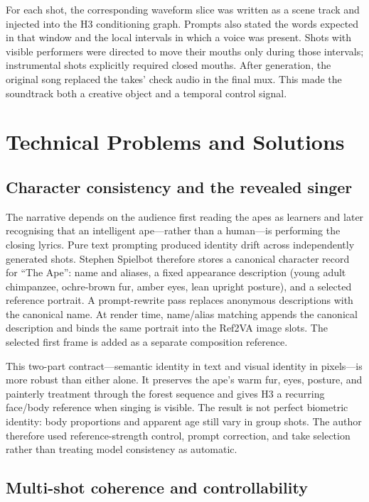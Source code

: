 \documentclass[sigconf]{acmart}
\begin{document}
For each shot, the corresponding waveform slice was written as a scene track and injected into the H3 conditioning graph. Prompts also stated the words expected in that window and the local intervals in which a voice was present. Shots with visible performers were directed to move their mouths only during those intervals; instrumental shots explicitly required closed mouths. After generation, the original song replaced the takes' check audio in the final mux. This made the soundtrack both a creative object and a temporal control signal.

\section{Technical Problems and Solutions}

\subsection{Character consistency and the revealed singer}

The narrative depends on the audience first reading the apes as learners and later recognising that an intelligent ape---rather than a human---is performing the closing lyrics. Pure text prompting produced identity drift across independently generated shots. Stephen Spielbot therefore stores a canonical character record for ``The Ape'': name and aliases, a fixed appearance description (young adult chimpanzee, ochre-brown fur, amber eyes, lean upright posture), and a selected reference portrait. A prompt-rewrite pass replaces anonymous descriptions with the canonical name. At render time, name/alias matching appends the canonical description and binds the same portrait into the Ref2VA image slots. The selected first frame is added as a separate composition reference.

This two-part contract---semantic identity in text and visual identity in pixels---is more robust than either alone. It preserves the ape's warm fur, eyes, posture, and painterly treatment through the forest sequence and gives H3 a recurring face/body reference when singing is visible. The result is not perfect biometric identity: body proportions and apparent age still vary in group shots. The author therefore used reference-strength control, prompt correction, and take selection rather than treating model consistency as automatic.

\subsection{Multi-shot coherence and controllability}
\end{document}
